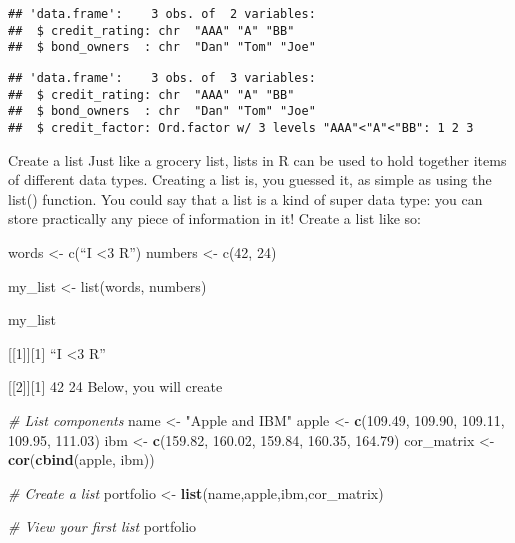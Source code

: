 \documentclass[]{article}
\newenvironment{Shaded}{\begin{snugshade}}{\end{snugshade}}
\newcommand{\KeywordTok}[1]{\textcolor[rgb]{0.13,0.29,0.53}{\textbf{#1}}}
\newcommand{\DataTypeTok}[1]{\textcolor[rgb]{0.13,0.29,0.53}{#1}}
\newcommand{\FloatTok}[1]{\textcolor[rgb]{0.00,0.00,0.81}{#1}}
\newcommand{\StringTok}[1]{\textcolor[rgb]{0.31,0.60,0.02}{#1}}
\newcommand{\CommentTok}[1]{\textcolor[rgb]{0.56,0.35,0.01}{\textit{#1}}}
\newcommand{\OtherTok}[1]{\textcolor[rgb]{0.56,0.35,0.01}{#1}}
\newcommand{\OperatorTok}[1]{\textcolor[rgb]{0.81,0.36,0.00}{\textbf{#1}}}
\newcommand{\NormalTok}[1]{#1}
\begin{document}
\begin{verbatim}
## 'data.frame':    3 obs. of  2 variables:
##  $ credit_rating: chr  "AAA" "A" "BB"
##  $ bond_owners  : chr  "Dan" "Tom" "Joe"
\end{verbatim}

\begin{Shaded}
\end{Shaded}

\begin{verbatim}
## 'data.frame':    3 obs. of  3 variables:
##  $ credit_rating: chr  "AAA" "A" "BB"
##  $ bond_owners  : chr  "Dan" "Tom" "Joe"
##  $ credit_factor: Ord.factor w/ 3 levels "AAA"<"A"<"BB": 1 2 3
\end{verbatim}

Create a list Just like a grocery list, lists in R can be used to hold
together items of different data types. Creating a list is, you guessed
it, as simple as using the list() function. You could say that a list is
a kind of super data type: you can store practically any piece of
information in it! Create a list like so:

words \textless{}- c(``I \textless{}3 R'') numbers \textless{}- c(42,
24)

my\_list \textless{}- list(words, numbers)

my\_list

{[}{[}1{]}{]}{[}1{]} ``I \textless{}3 R''

{[}{[}2{]}{]}{[}1{]} 42 24 Below, you will create

\begin{Shaded}
\begin{Highlighting}[]
\CommentTok{# List components}
\NormalTok{name <-}\StringTok{ "Apple and IBM"}
\NormalTok{apple <-}\StringTok{ }\KeywordTok{c}\NormalTok{(}\FloatTok{109.49}\NormalTok{, }\FloatTok{109.90}\NormalTok{, }\FloatTok{109.11}\NormalTok{, }\FloatTok{109.95}\NormalTok{, }\FloatTok{111.03}\NormalTok{)}
\NormalTok{ibm <-}\StringTok{ }\KeywordTok{c}\NormalTok{(}\FloatTok{159.82}\NormalTok{, }\FloatTok{160.02}\NormalTok{, }\FloatTok{159.84}\NormalTok{, }\FloatTok{160.35}\NormalTok{, }\FloatTok{164.79}\NormalTok{)}
\NormalTok{cor_matrix <-}\StringTok{ }\KeywordTok{cor}\NormalTok{(}\KeywordTok{cbind}\NormalTok{(apple, ibm))}

\CommentTok{# Create a list}
\NormalTok{portfolio <-}\StringTok{ }\KeywordTok{list}\NormalTok{(name,apple,ibm,cor_matrix)}

\CommentTok{# View your first list}
\NormalTok{portfolio}
\end{Highlighting}
\end{Shaded}
\end{document}

